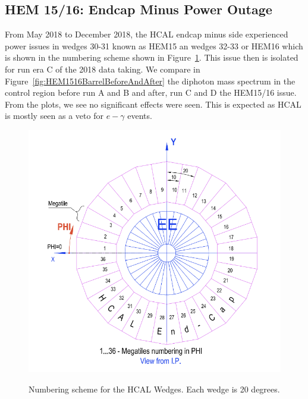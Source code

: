 \subsection{HEM 15/16: Endcap Minus Power Outage}

From May 2018 to December 2018, the HCAL endcap minus side experienced power issues in wedges 30-31 known as HEM15 an wedges 32-33 or HEM16 which is shown in the numbering scheme shown in Figure~\ref{fig:HCALwedges}. This issue then is isolated for run era C of the 2018 data taking. We compare in Figure~\ref{fig:HEM1516BarrelBeforeAndAfter} the diphoton mass spectrum in the control region before run A and B and after, run C and D the HEM15/16 issue. From the plots, we see no significant effects were seen. This is expected as HCAL is mostly seen as a veto for $e-\gamma$ events. 

\begin{figure}[!htbp]
	\centering
    \caption{Numbering scheme for the HCAL Wedges. Each wedge is 20 degrees.}
	\includegraphics[scale=0.65]{fig/NumberingSchemeHCALWedges.png}
	\label{fig:HCALwedges}
\end{figure}


